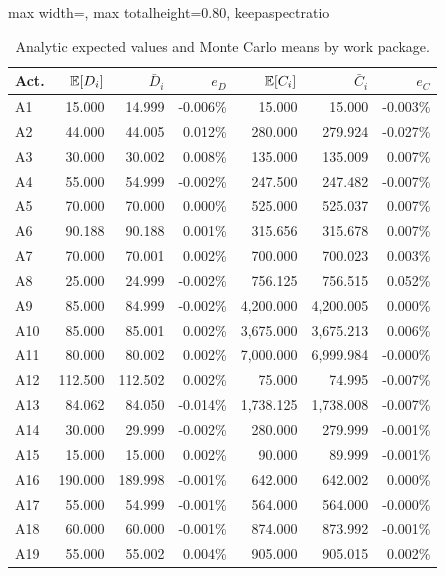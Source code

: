 \begin{table}[H]
\centering
\caption{Analytic expected values and Monte Carlo means by work package.}
\label{tab:workpackage-expected-value-comparison}
\scriptsize
\setlength{\tabcolsep}{3pt}
\renewcommand{\arraystretch}{0.92}
\begin{adjustbox}{max width=\textwidth, max totalheight=0.80\textheight, keepaspectratio}
\begin{tabular}{@{}lrrrrrr@{}}
\toprule
Act. & $\mathbb{E}[D_i]$ & $\bar D_i$ & $e_D$ & $\mathbb{E}[C_i]$ & $\bar C_i$ & $e_C$ \\
\midrule
A1 & 15.000 & 14.999 & -0.006\% & 15.000 & 15.000 & -0.003\% \\
A2 & 44.000 & 44.005 & 0.012\% & 280.000 & 279.924 & -0.027\% \\
A3 & 30.000 & 30.002 & 0.008\% & 135.000 & 135.009 & 0.007\% \\
A4 & 55.000 & 54.999 & -0.002\% & 247.500 & 247.482 & -0.007\% \\
A5 & 70.000 & 70.000 & 0.000\% & 525.000 & 525.037 & 0.007\% \\
A6 & 90.188 & 90.188 & 0.001\% & 315.656 & 315.678 & 0.007\% \\
A7 & 70.000 & 70.001 & 0.002\% & 700.000 & 700.023 & 0.003\% \\
A8 & 25.000 & 24.999 & -0.002\% & 756.125 & 756.515 & 0.052\% \\
A9 & 85.000 & 84.999 & -0.002\% & 4,200.000 & 4,200.005 & 0.000\% \\
A10 & 85.000 & 85.001 & 0.002\% & 3,675.000 & 3,675.213 & 0.006\% \\
A11 & 80.000 & 80.002 & 0.002\% & 7,000.000 & 6,999.984 & -0.000\% \\
A12 & 112.500 & 112.502 & 0.002\% & 75.000 & 74.995 & -0.007\% \\
A13 & 84.062 & 84.050 & -0.014\% & 1,738.125 & 1,738.008 & -0.007\% \\
A14 & 30.000 & 29.999 & -0.002\% & 280.000 & 279.999 & -0.001\% \\
A15 & 15.000 & 15.000 & 0.002\% & 90.000 & 89.999 & -0.001\% \\
A16 & 190.000 & 189.998 & -0.001\% & 642.000 & 642.002 & 0.000\% \\
A17 & 55.000 & 54.999 & -0.001\% & 564.000 & 564.000 & -0.000\% \\
A18 & 60.000 & 60.000 & -0.001\% & 874.000 & 873.992 & -0.001\% \\
A19 & 55.000 & 55.002 & 0.004\% & 905.000 & 905.015 & 0.002\% \\

\end{tabular}
\end{adjustbox}
\end{table}
